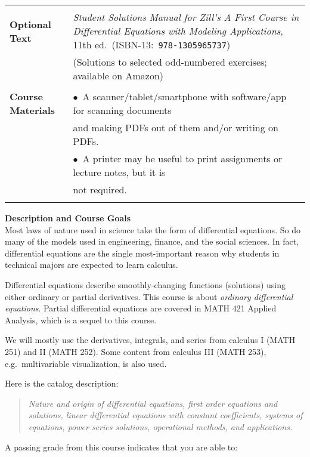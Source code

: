 \documentclass[12pt]{article}
\renewcommand{\emph}[1]{\textsf{\textbf{#1}}}
\newcommand{\localhead}[1]{\par\smallskip\textbf{#1}\nobreak\\}%
\def\heading#1{\localhead{\large\emph{#1}}}
\begin{document}
\begin{tabularx}{\textwidth}{lX}
 & \\
\emph{Optional Text}     & \textit{Student Solutions Manual for Zill's A First Course in Differential Equations with Modeling Applications}, 11th ed.~(ISBN-13:\, \texttt{978-1305965737}) \\
    & (Solutions to selected odd-numbered exercises; available on Amazon) \\
 & \\
\emph{Course Materials}  & $\bullet$\, A scanner/tablet/smartphone with software/app for scanning documents \\
                         & \quad and making PDFs out of them and/or writing on PDFs. \\
                         & $\bullet$\, A printer may be useful to print assignments or lecture notes, but it is \\
                         & \quad not required. \\
 & 
\end{tabularx}

\vfill

\cfoot{\thepage}

\heading{Description and Course Goals}
Most laws of nature used in science take the form of differential equations.  So do many of the models used in engineering, finance, and the social sciences.  In fact, differential equations are the single most-important reason why students in technical majors are expected to learn calculus.

Differential equations describe smoothly-changing functions (solutions) using either ordinary or partial derivatives.  This course is about \textsl{ordinary differential equations}.  Partial differential equations are covered in MATH 421 Applied Analysis, which is a sequel to this course.

We will mostly use the derivatives, integrals, and series from calculus I (MATH 251) and II (MATH 252).  Some content from calculus III (MATH 253), e.g.~multivariable visualization, is also used.

Here is the catalog description:
\begin{quote}
\textsl{Nature and origin of differential equations, first order equations and solutions, linear differential equations with constant coefficients, systems of equations, power series solutions, operational methods, and applications.}
\end{quote}

A passing grade from this course indicates that you are able to:
\end{document}
